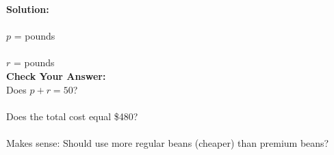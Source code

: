 \documentclass[12pt]{article}
\begin{document}
            \textbf{Solution:}\\\\
            $p$ = \underline{\hspace{1in}} pounds\\\\
            $r$ = \underline{\hspace{1in}} pounds\\
        
            \textbf{Check Your Answer:}\\
            Does $p + r = 50$? \underline{\hspace{2in}}\\\\
            Does the total cost equal \$480? \underline{\hspace{3in}}\\\\
            Makes sense: Should use more regular beans (cheaper) than premium beans? \underline{\hspace{2.5in}}
        
            \newpage
	
\end{document}
